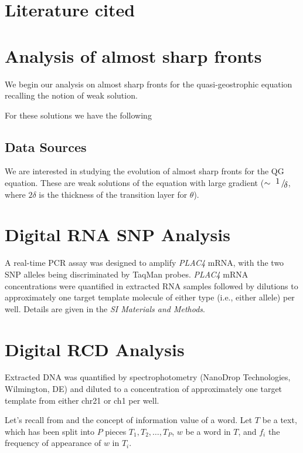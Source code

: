 \documentclass{pnastwo}
\begin{document}
\begin{article}
\section{Literature cited}



\section{Analysis of almost sharp fronts}
We begin our analysis on almost sharp fronts for the
quasi-geostrophic equation recalling the notion of weak solution.

For these solutions we have the following


\subsection{Data Sources}
We are interested in studying the evolution of almost sharp fronts
for the QG equation. These are weak solutions of the equation with
large gradient ($\sim \displaystyle{ \inlinefrac{1}{\delta}}$, where $2
\delta$ is the thickness of the transition layer for $\theta$).



\begin{materials}
\section{Digital RNA SNP Analysis} A real-time PCR assay was designed
to amplify {\it PLAC4} mRNA, with the two SNP alleles being discriminated
by TaqMan probes. {\it PLAC4} mRNA concentrations were quantified in
extracted RNA samples followed by dilutions to approximately one target
template molecule of either type (i.e., either allele) per well.
Details are given in the {\it SI Materials and Methods}.

\section{Digital RCD Analysis} Extracted DNA was quantified by
spectrophotometry (NanoDrop Technologies, Wilmington, DE) and diluted to a
concentration of 
approximately one target template from either chr21 or ch1 per well.
\end{materials}


Let's recall from \cite{DARWIN} and \cite{ENTROPIC} the concept of information value of a word. 
Let $T$ be a text, which has been split into $P$ pieces $T_1, T_2, \dots, T_P$, $w$ be a word in $T$,
and $f_i$ the frequency of appearance of $w$ in $T_i$.


\end{article}
\end{document}
